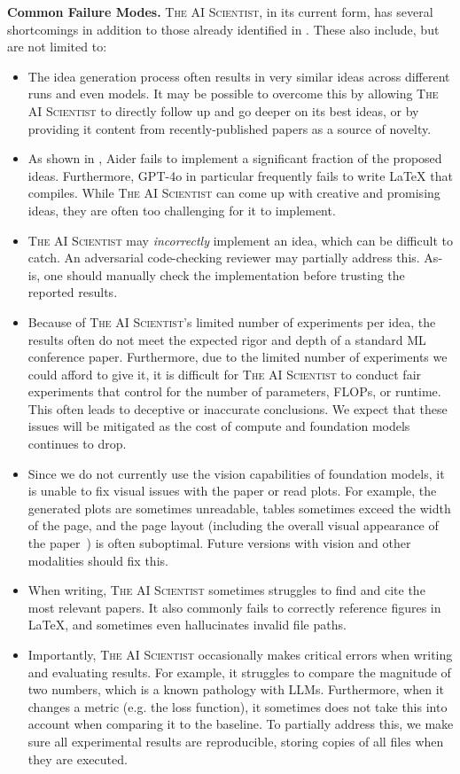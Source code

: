 \documentclass[11pt, a4paper]{include/gdm_format}
\newcommand{\ouralgo}{\textsc{The AI Scientist}\xspace}
\begin{document}
\textbf{Common Failure Modes.} \ouralgo, in its current form, has several shortcomings in addition to those already identified in . These also include, but are not limited to:
\begin{itemize}
    \item The idea generation process often results in very similar ideas across different runs and even models. It may be possible to overcome this by allowing \ouralgo to directly follow up and go deeper on its best ideas, or by providing it content from recently-published papers as a source of novelty.
    \item As shown in , Aider fails to implement a significant fraction of the proposed ideas. Furthermore, GPT-4o in particular frequently fails to write LaTeX that compiles. While \ouralgo can come up with creative and promising ideas, they are often too challenging for it to implement.
    \item \ouralgo may \textit{incorrectly} implement an idea, which can be difficult to catch. An adversarial code-checking reviewer may partially address this. As-is, one should manually check the implementation before trusting the reported results.
    \item Because of \ouralgo's limited number of experiments per idea, the results often do not meet the expected rigor and depth of a standard ML conference paper. Furthermore, due to the limited number of experiments we could afford to give it, it is difficult for \ouralgo to conduct fair experiments that control for the number of parameters, FLOPs, or runtime. This often leads to deceptive or inaccurate conclusions. We expect that these issues will be mitigated as the cost of compute and foundation models continues to drop.
    \item Since we do not currently use the vision capabilities of foundation models, it is unable to fix visual issues with the paper or read plots. For example, the generated plots are sometimes unreadable, tables sometimes exceed the width of the page, and the page layout (including the overall visual appearance of the paper~\citep{huang2018deep}) is often suboptimal. Future versions with vision and other modalities should fix this.
    \item When writing, \ouralgo sometimes struggles to find and cite the most relevant papers. It also commonly fails to correctly reference figures in LaTeX, and sometimes even hallucinates invalid file paths.
    \item Importantly, \ouralgo occasionally makes critical errors when writing and evaluating results. For example, it struggles to compare the magnitude of two numbers, which is a known pathology with LLMs. Furthermore, when it changes a metric (e.g. the loss function), it sometimes does not take this into account when comparing it to the baseline. To partially address this, we make sure all experimental results are reproducible, storing copies of all files when they are executed.

\end{itemize}
\end{document}
